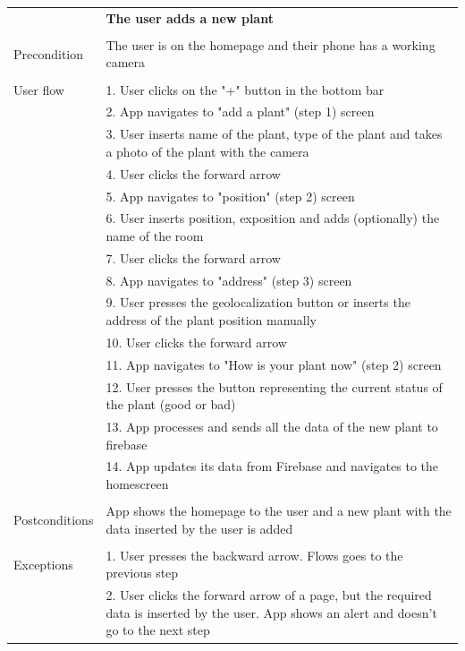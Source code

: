 \documentclass[10pt]{article}
\begin{document}
    \newline
    \newline
    \newline
    \begin{tabular}{ p{3cm}|p{8cm} }
     & \textbf{The user adds a new plant} \\
     \\
     Precondition & The user is on the homepage and their phone has a working camera \\ 
     \\
     User flow 
     & 1. User clicks on the "+" button in the bottom bar \\
     & 2. App navigates to "add a plant" (step 1) screen\\ 
     & 3. User inserts name of the plant, type of the plant and takes a photo of the plant with the camera  \\
     & 4. User clicks the forward arrow\\
     & 5. App navigates to "position" (step 2) screen \\
     & 6. User inserts position, exposition and adds (optionally) the name of the room \\
     & 7. User clicks the forward arrow \\
     & 8. App navigates to "address" (step 3) screen \\
     & 9. User presses the geolocalization button or inserts the address of the plant position manually \\
     & 10. User clicks the forward arrow \\
     & 11. App navigates to "How is your plant now" (step 2) screen \\
     & 12. User presses the button representing the current status of the plant (good or bad) \\
     & 13. App processes and sends all the data of the new plant to firebase \\
     & 14. App updates its data from Firebase and navigates to the homescreen \\
     \\
     Postconditions & App shows the homepage to the user and a new plant with the data inserted by the user is added \\
     \\
     Exceptions 
     & 1. User presses the backward arrow. Flows goes to the previous step\\
     & 2. User clicks the forward arrow of a page, but the required data is inserted by the user. App shows an alert and doesn't go to the next step\\
    \end{tabular}
\end{document}
